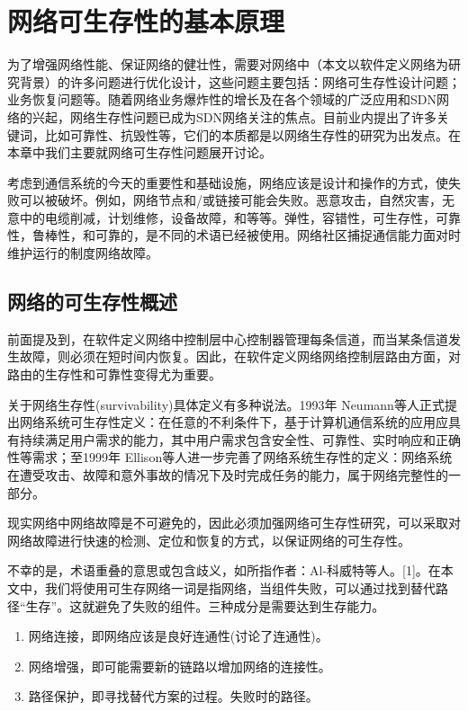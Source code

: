 \chapter{网络可生存性的基本原理}
为了增强网络性能、保证网络的健壮性，需要对网络中（本文以软件定义网络为研究背景）的许多问题进行优化设计，这些问题主要包括：网络可生存性设计问题；业务恢复问题等。随着网络业务爆炸性的增长及在各个领域的广泛应用和SDN网络的兴起，网络生存性问题已成为SDN网络关注的焦点。目前业内提出了许多关键词，比如可靠性、抗毁性等，它们的本质都是以网络生存性的研究为出发点。在本章中我们主要就网络可生存性问题展开讨论。

考虑到通信系统的今天的重要性和基础设施，网络应该是设计和操作的方式，使失败可以被破坏。例如，网络节点和/或链接可能会失败。恶意攻击，自然灾害，无意中的电缆削减，计划维修，设备故障，和等等。弹性，容错性，可生存性，可靠性，鲁棒性，和可靠的，是不同的术语已经被使用。网络社区捕捉通信能力面对时维护运行的制度网络故障。

\section{网络的可生存性概述}
前面提及到，在软件定义网络中控制层中心控制器管理每条信道，而当某条信道发生故障，则必须在短时间内恢复。因此，在软件定义网络网络控制层路由方面，对路由的生存性和可靠性变得尤为重要。

关于网络生存性(survivability)具体定义有多种说法\cite{al2009comparative}。1993年 Neumann\cite{hollway1993survivable}等人正式提出网络系统可生存性定义：在任意的不利条件下，基于计算机通信系统的应用应具有持续满足用户需求的能力，其中用户需求包含安全性、可靠性、实时响应和正确性等需求；至1999年 Ellison\cite{ellison1997survivable}等人进一步完善了网络系统生存性的定义：网络系统在遭受攻击、故障和意外事故的情况下及时完成任务的能力，属于网络完整性的一部分。

现实网络中网络故障是不可避免的，因此必须加强网络可生存性研究，可以采取对网络故障进行快速的检测、定位和恢复的方式，以保证网络的可生存性。

不幸的是，术语重叠的意思或包含歧义，如所指作者：Al-科威特等人。[1]。在本文中，我们将使用可生存网络一词是指网络，当组件失败，可以通过找到替代路径“生存”。这就避免了失败的组件。三种成分是需要达到生存能力。


\begin{enumerate}
  \item 网络连接，即网络应该是良好连通性(讨论了连通性)。
  \item 网络增强，即可能需要新的链路以增加网络的连接性。
  \item 路径保护，即寻找替代方案的过程。失败时的路径。
\end{enumerate}

